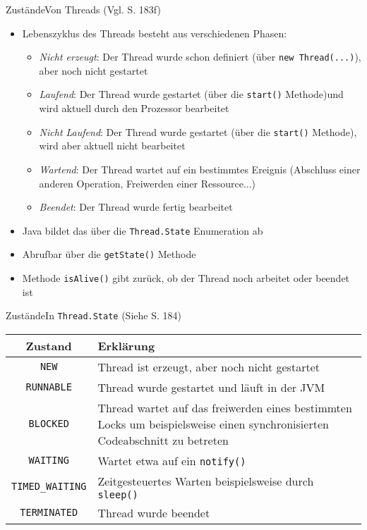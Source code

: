 \begin{frame}{Zustände}{Von Threads (Vgl. \cite{ullenboom2014java} S. 183f)}
    \begin{itemize}
        \item Lebenszyklus des Threads besteht aus verschiedenen Phasen:
        \begin{itemize}
            \item \textit{Nicht erzeugt}: Der Thread wurde schon definiert (über \texttt{new Thread(...)}), aber noch nicht gestartet
            \item \textit{Laufend}: Der Thread wurde gestartet (über die \texttt{start()} Methode)und wird aktuell durch den Prozessor bearbeitet
            \item \textit{Nicht Laufend}: Der Thread wurde gestartet (über die \texttt{start()} Methode), wird aber aktuell nicht bearbeitet
            \item \textit{Wartend}: Der Thread wartet auf ein bestimmtes Ereignis (Abschluss einer anderen Operation, Freiwerden einer Ressource...)
            \item \textit{Beendet}: Der Thread wurde fertig bearbeitet
        \end{itemize}
        \item Java bildet das über die \texttt{Thread.State} Enumeration ab
        \item Abrufbar über die \texttt{getState()} Methode
        \item Methode \texttt{isAlive()} gibt zurück, ob der Thread noch arbeitet oder beendet ist
    \end{itemize}
\end{frame}

\begin{frame}{Zustände}{In \texttt{Thread.State} (Siehe \cite{ullenboom2014java} S. 184)}
    \begin{tabular}{|c|p{9cm}|}
    \hline
    \textbf{Zustand}&\textbf{Erklärung}\\
    \hline
    \hline
    \texttt{NEW} & Thread ist erzeugt, aber noch nicht gestartet\\\hline
    \texttt{RUNNABLE} & Thread wurde gestartet und läuft in der JVM\\\hline
    \texttt{BLOCKED} & Thread wartet auf das freiwerden eines bestimmten Locks um beispielsweise einen synchronisierten Codeabschnitt zu betreten\\\hline
    \texttt{WAITING} & Wartet etwa auf ein \texttt{notify()}\\\hline
    \texttt{TIMED\_WAITING} & Zeitgesteuertes Warten beispielsweise durch \texttt{sleep()}\\\hline
    \texttt{TERMINATED} & Thread wurde beendet\\\hline
    \end{tabular}
\end{frame}
